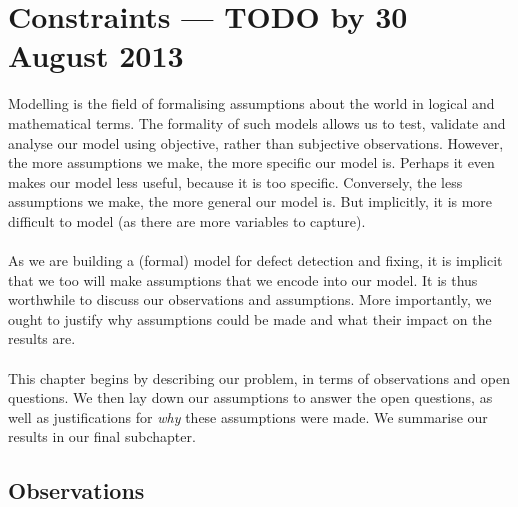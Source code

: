 \section{Constraints --- TODO by 30 August 2013}

Modelling is the field of formalising assumptions about the world in logical and mathematical terms.
The formality of such models allows us to test, validate and analyse our model using objective, rather than subjective observations.
However, the more assumptions we make, the more specific our model is.
Perhaps it even makes our model less useful, because it is too specific.
Conversely, the less assumptions we make, the more general our model is.
But implicitly, it is more difficult to model (as there are more variables to capture).\\
\\
As we are building a (formal) model for defect detection and fixing, it is implicit that we too will make assumptions that we encode into our model.
It is thus worthwhile to discuss our observations and assumptions.
More importantly, we ought to justify why assumptions could be made and what their impact on the results are.\\
\\
This chapter begins by describing our problem, in terms of observations and open questions.
We then lay down our assumptions to answer the open questions, as well as justifications for {\em why} these assumptions were made.
We summarise our results in our final subchapter.

\subsection{Observations}

